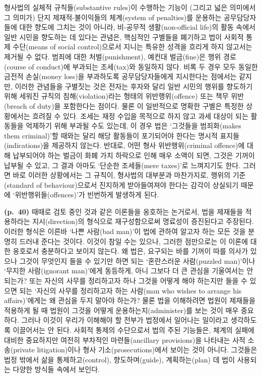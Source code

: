 형사법의 실체적 규칙들(substantive rules)이 수행하는 기능이 (그리고 넓은
의미에서 그 의미가) 단지 제재적-불이익들의 체계(system of penalties)를
운용하는 공무담당자들에 대한 향도에 그치는 것이 아니라, 비-공무적
생활(non-official life)의 활동 속에서 일반 시민을 향도하는 데 있다는
관념은, 핵심적인 구별들을 폐기하고 법이 사회적 통제 수단(means of social
control)으로서 지니는 특유한 성격을 흐리게 하지 않고서는 제거될 수 없다.
범죄에 대한 처벌(punishment), 예컨대 벌금(fine)은 행위 경로(course of
conduct)에 부과되는 조세(tax)와 동일하지 않다. 비록 두 경우 모두 동일한
금전적 손실(money loss)을 부과하도록 공무담당자들에게 지시한다는
점에서는 같지만, 이러한 관념들을 구별짓는 것은 전자는 후자와 달리 일반
시민의 행위를 향도하기 위해 세워진 규칙의 침해(violation)라는 형태의
위반행위(offence) 또는 책무 위반(breach of duty)을 포함한다는 점이다.
물론 이 일반적으로 명확한 구별은 특정한 상황에서는 흐려질 수 있다.
조세는 재정 수입을 목적으로 하지 않고 과세 대상이 되는 활동들을 억제하기
위해 부과될 수도 있는데, 이 경우 법은 ‘그것들을 범죄화(makes them
criminal)’할 때와는 달리 해당 활동들이 포기되어야 한다는 명시적
표지들(indications)을 제공하지 않는다. 반대로, 어떤 형사
위반행위(criminal offence)에 대해 납부되어야 하는 벌금이 화폐 가치
하락으로 인해 매우 소액이 되면, 그것은 기꺼이 납부될 수 있고, 그 결과
아마도 ‘단순한 조세들(mere taxes)’로 느껴지기도 한다. 그러면 바로 이러한
상황에서는 그 규칙이, 형사법의 대부분과 마찬가지로, 행위의 기준(standard
of behaviour)으로서 진지하게 받아들여져야 한다는 감각이 상실되기 때문에
‘위반행위들(offences)’가 빈번하게 발생하게 된다.

\textbf{(p.~40)} 때때로 검토 중인 것과 같은 이론들을 옹호하는 논거로서,
법을 제재들을 적용하라는 지시(direction)의 형식으로 재구성함으로써
명료성이 증진된다고 주장된다. 이러한 형식은 이른바 ‘나쁜 사람(bad
man)’이 법에 관하여 알고자 하는 모든 것을 분명히 드러내 준다는 것이다.
이것이 참일 수는 있으나, 그러한 점만으로는 이 이론에 대한 옹호로서
충분하다고 보이지 않는다. 왜 법은, 요구되는 바를 기꺼이 따를 의사가
있으나 그것이 무엇인지 들을 수 있기만 하면 되는 ‘혼란스러운 사람(puzzled
man)’이나 ‘무지한 사람(ignorant man)’에게 동등하게, 아니 그보다 더 큰
관심을 기울여서는 안 되는가? 또는 자신의 사무를 정리하고자 하나 그것을
어떻게 해야 하는지만 들을 수 있으면 되는 ‘자신의 사무를 정리하고자 하는
사람(man who wishes to arrange his affairs)’에게는 왜 관심을 두지 말아야
하는가? 물론 법을 이해하려면 법원이 제재들을 적용하게 될 때 법원이
그것을 어떻게 운용하는지(administer)를 보는 것이 매우 중요하다. 그러나
이것이 우리가 이해해야 할 전부가 법정에서 일어나는 일이라고 생각하도록
이끌어서는 안 된다. 사회적 통제의 수단으로서 법의 주된 기능들은, 체계의
실패에 대비한 중요하지만 여전히 부차적인 마련들(ancillary provisions)을
나타내는 사적 소송(private litigation)이나 형사 기소(prosecutions)에서
보이는 것이 아니다. 그것들은 법정 밖에서 삶을 통제하고(control),
향도하며(guide), 계획하는(plan) 데 법이 사용되는 다양한 방식들 속에서
보인다.


